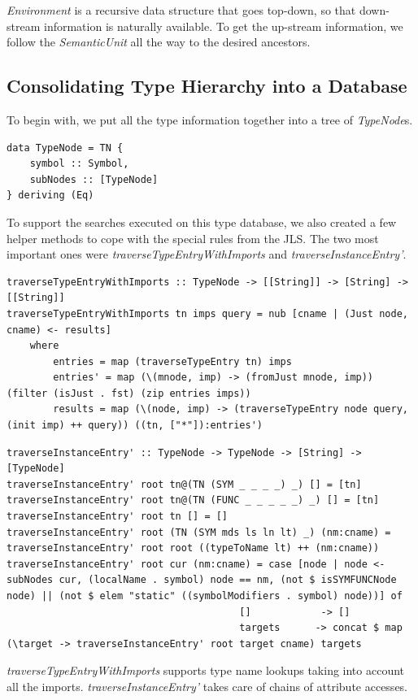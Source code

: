 \documentclass[12pt,letterpaper]{article}
\begin{document}
\emph{Environment} is a recursive data structure that goes top-down, so that down-stream information is naturally available. To get the up-stream information, we follow the \emph{SemanticUnit} all the way to the desired ancestors.

\subsection{Consolidating Type Hierarchy into a Database}
To begin with, we put all the type information together into a tree of \emph{TypeNode}s.
\begin{lstlisting}
data TypeNode = TN {
    symbol :: Symbol,
    subNodes :: [TypeNode]
} deriving (Eq)
\end{lstlisting}

To support the searches executed on this type database, we also created a few helper methods to cope with the special rules from the JLS. The two most important ones were \emph{traverseTypeEntryWithImports} and \emph{traverseInstanceEntry'}.
\begin{lstlisting}
traverseTypeEntryWithImports :: TypeNode -> [[String]] -> [String] -> [[String]]
traverseTypeEntryWithImports tn imps query = nub [cname | (Just node, cname) <- results]
    where
        entries = map (traverseTypeEntry tn) imps
        entries' = map (\(mnode, imp) -> (fromJust mnode, imp)) (filter (isJust . fst) (zip entries imps))
        results = map (\(node, imp) -> (traverseTypeEntry node query, (init imp) ++ query)) ((tn, ["*"]):entries')
\end{lstlisting}

\begin{lstlisting}
traverseInstanceEntry' :: TypeNode -> TypeNode -> [String] -> [TypeNode]
traverseInstanceEntry' root tn@(TN (SYM _ _ _ _) _) [] = [tn]
traverseInstanceEntry' root tn@(TN (FUNC _ _ _ _ _) _) [] = [tn]
traverseInstanceEntry' root tn [] = []
traverseInstanceEntry' root (TN (SYM mds ls ln lt) _) (nm:cname) = traverseInstanceEntry' root root ((typeToName lt) ++ (nm:cname))
traverseInstanceEntry' root cur (nm:cname) = case [node | node <- subNodes cur, (localName . symbol) node == nm, (not $ isSYMFUNCNode node) || (not $ elem "static" ((symbolModifiers . symbol) node))] of
                                        []            -> []
                                        targets      -> concat $ map (\target -> traverseInstanceEntry' root target cname) targets
\end{lstlisting}

\emph{traverseTypeEntryWithImports} supports type name lookups taking into account all the imports. \emph{traverseInstanceEntry'} takes care of chains of attribute accesses.
\end{document}
